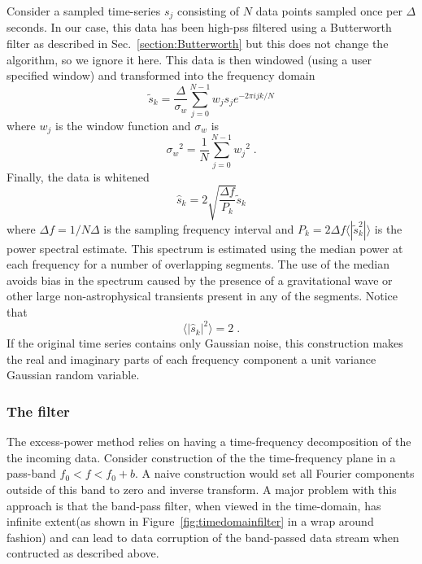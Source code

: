 Consider a sampled time-series $s_j$ consisting of $N$ data points
sampled once per $\Delta$ seconds.  In our case,  this data has been
high-pss filtered using a Butterworth filter as described in
Sec.~\ref{section:Butterworth} but this does not change the algorithm,  so
we ignore it here.  This data is then windowed (using a user specified
window) and transformed into the frequency domain
\begin{equation}
\tilde{s}_k =  \frac{\Delta}{\sigma_w} \sum_{j=0}^{N-1} w_js_j e^{-2 \pi i j k /N}
\end{equation}
where $w_j$ is the window function and $\sigma_w$ is  
\begin{equation}
{\sigma_w}^2 = \frac{1}{N}\sum_{j=0}^{N-1}{w_j}^2 \; .
\end{equation}
Finally,  the data is whitened
\begin{equation}
\hat{s}_k = 2\sqrt{\frac{\Delta f}{P_k}}\tilde{s}_k
\end{equation}
where $\Delta f = {1}/{N\Delta}$ is the sampling frequency interval and 
$P_k = 2 \Delta f\langle|\tilde{s}_k^2| \rangle$ is the 
power spectral estimate.  This spectrum is estimated using the median
power at each frequency for a number of overlapping segments.
The use of the median avoids bias in the spectrum caused by the
presence of a gravitational wave or other large non-astrophysical
transients present in any of the segments.   Notice that 
\begin{equation}
\langle | \hat{s}_k |^2 \rangle = 2 \; .
\end{equation}
If the original time series contains only Gaussian noise,  this
construction makes the real and imaginary parts of
each frequency component a unit variance Gaussian random variable. 

\subsubsection{The filter}

The excess-power method relies on having a time-frequency decomposition of
the the incoming data.   Consider construction of the the time-frequency
plane in a pass-band $f_0 < f < f_0+b$.  A naive construction would set all
Fourier components outside of this band to zero and inverse transform.  A
major problem with this approach is that the band-pass filter,  when viewed
in the time-domain, has infinite extent(as shown in
Figure~\ref{fig:timedomainfilter} in a wrap around fashion) and can lead to
data corruption of the band-passed data stream when contructed as described
above. 

